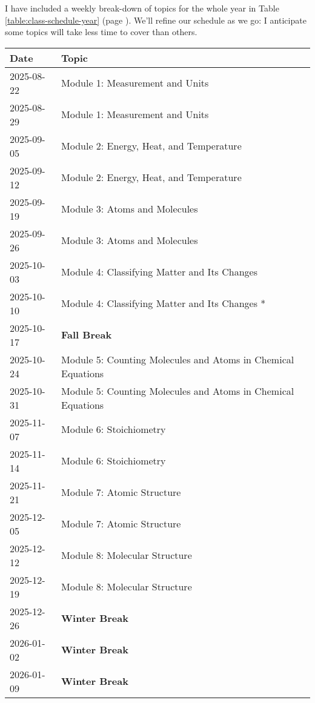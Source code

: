 \documentclass[11pt, oneside]{article}   	%
\begin{document}
I have included a weekly break-down of topics for the whole year in Table \ref{table:class-schedule-year} (page \pageref{table:class-schedule-year} ).
We'll refine our schedule as we go: I anticipate some topics will take less time to cover than others.

\begin{table}[h]
\centering
\begin{tabular}{ l | l }
Date & Topic \\
\hline
2025-08-22 & Module 1:  Measurement and Units \\
2025-08-29 & Module 1:  Measurement and Units \\
2025-09-05 & Module 2: Energy, Heat, and Temperature \\
2025-09-12 & Module 2: Energy, Heat, and Temperature \\
2025-09-19 & Module 3: Atoms and Molecules \\
2025-09-26 & Module 3: Atoms and Molecules \\
2025-10-03 & Module 4: Classifying Matter and Its Changes \\
2025-10-10 & Module 4: Classifying Matter and Its Changes * \\

2025-10-17 & \textbf{Fall Break} \\

2025-10-24 & Module 5: Counting Molecules and Atoms in Chemical Equations \\
2025-10-31 & Module 5: Counting Molecules and Atoms in Chemical Equations \\
2025-11-07 & Module 6: Stoichiometry \\
2025-11-14 & Module 6: Stoichiometry \\
2025-11-21 & Module 7: Atomic Structure \\
2025-12-05 & Module 7: Atomic Structure \\
2025-12-12 & Module 8: Molecular Structure \\
2025-12-19 & Module 8: Molecular Structure \\

2025-12-26  & \textbf{Winter Break} \\
2026-01-02  & \textbf{Winter Break} \\
2026-01-09  & \textbf{Winter Break} \\


\end{tabular}
\end{table}
\end{document}

